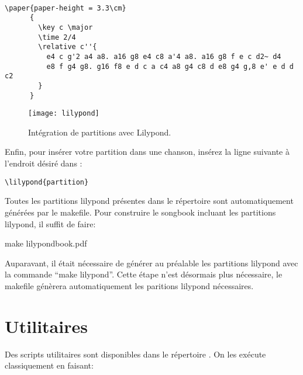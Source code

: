 \documentclass[versionenligne]{patacrep}
\begin{document}
\begin{verbatim}

\paper{paper-height = 3.3\cm}
      {
        \key c \major
        \time 2/4
        \relative c''{
          e4 c g'2 a4 a8. a16 g8 e4 c8 a'4 a8. a16 g8 f e c d2~ d4
          e8 f g4 g8. g16 f8 e d c a c4 a8 g4 c8 d e8 g4 g,8 e' e d d c2
        }
      }
\end{verbatim}

\begin{figure}
  \centering
  \texttt{[image: lilypond]}
  \caption{Intégration de partitions avec Lilypond.}
  \label{fig:lilypond}
\end{figure}

Enfin, pour insérer votre partition dans une chanson, insérez la ligne
suivante à l'endroit désiré dans :

\begin{verbatim}
\lilypond{partition}
\end{verbatim}

Toutes les partitions lilypond présentes dans le répertoire
 sont automatiquement générées par le
makefile. Pour construire le songbook incluant les partitions
lilypond, il suffit de faire:

\begin{unixcom}
  make lilypondbook.pdf 
\end{unixcom}

\begin{nota}
  Auparavant, il était nécessaire de générer au préalable les
  partitions lilypond avec la commande ``make lilypond''. Cette étape
  n'est désormais plus nécessaire, le makefile génèrera
  automatiquement les paritions lilypond nécessaires.
\end{nota}

\section{Utilitaires}
\label{sect:utilitaires}

Des scripts utilitaires sont disponibles dans le répertoire
. On les exécute classiquement en faisant:

\end{document}
